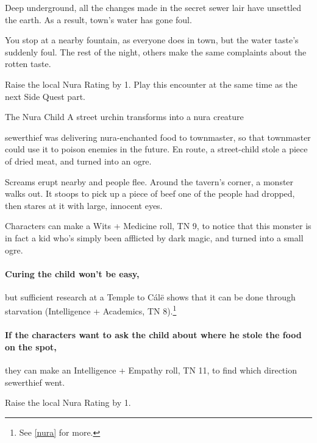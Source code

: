 \begin{multicols}{2}
Deep underground, all the changes made in the secret sewer lair have unsettled the earth.
As a result, \gls{town}'s water has gone foul.

\begin{boxtext}

	You stop at a nearby fountain, as everyone does in \gls{town}, but the water taste's suddenly foul.
	The rest of the night, others make the same complaints about the rotten taste.

\end{boxtext}

Raise the local Nura Rating by 1.
Play this encounter at the same time as the next Side Quest part.

{\N The Nura Child}%
{A street urchin transforms into a nura creature}%

\Gls{sewerthief} was delivering nura-enchanted food to \gls{townmaster}, so that \gls{townmaster} could use it to poison enemies in the future.
En route, a street-child stole a piece of dried meat, and turned into an ogre.

\begin{boxtext}

	Screams erupt nearby and people flee.
	Around the tavern's corner, a monster walks out.
	It stoops to pick up a piece of beef one of the people had dropped, then stares at it with large, innocent eyes.

\end{boxtext}

Characters can make a Wits + Medicine roll, TN 9, to notice that this monster is in fact a kid who's simply been afflicted by dark magic, and turned into a small ogre.

\paragraph{Curing the child won't be easy,}
but sufficient research at a Temple to C\'{a}l\"{e} shows that it can be done through starvation (Intelligence + Academics, TN 8).\footnote{See \autoref{nura} for more.}

\paragraph{If the characters want to ask the child about where he stole the food on the spot,}
they can make an Intelligence + Empathy roll, TN 11, to find which direction \gls{sewerthief} went.

Raise the local Nura Rating by 1.


\end{multicols}
